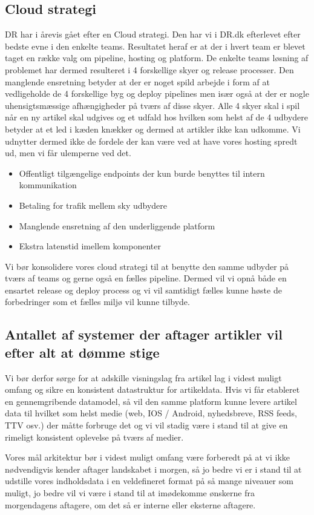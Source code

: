 \documentclass{article}
\begin{document}
\subsection{Cloud strategi}
DR har i årevis gået efter en Cloud strategi. Den har vi i DR.dk efterlevet efter bedste evne i den enkelte teams. Resultatet heraf er at der i hvert team er blevet taget en række valg om pipeline, hosting og platform.
De enkelte teams løsning af problemet har dermed resulteret i 4 forskellige skyer og release processer. Den manglende ensretning betyder at der er noget spild arbejde i form af at vedligeholde de 4 forskellige byg og deploy pipelines men især også at der er nogle uhensigtsmæssige afhængigheder på tværs af disse skyer. 
Alle 4 skyer skal i spil når en ny artikel skal udgives og et udfald hos hvilken som helst af de 4 udbydere betyder at et led i kæden knækker og dermed at artikler ikke kan udkomme. Vi udnytter dermed ikke de fordele der kan være ved at have vores hosting spredt ud, men vi får ulemperne ved det.
\begin{itemize}
\item Offentligt tilgængelige endpoints der kun burde benyttes til intern kommunikation
\item Betaling for trafik mellem sky udbydere
\item Manglende ensretning af den underliggende platform
\item Ekstra latenstid imellem komponenter 
\end{itemize}
Vi bør konsolidere vores cloud strategi til at benytte den samme udbyder på tværs af teams og gerne også en fælles pipeline. Dermed vil vi opnå både en ensartet release og deploy process og vi vil samtidigt fælles kunne høste de forbedringer som et fælles miljø vil kunne tilbyde.


\subsection{Antallet af systemer der aftager artikler vil efter alt at dømme stige}
Vi bør derfor sørge for at adskille visningslag fra artikel lag i videst muligt omfang og sikre en konsistent datastruktur for artikeldata. Hvis vi får etableret en gennemgribende datamodel, så vil den samme platform kunne levere artikel data til hvilket som helst medie (web, IOS / Android, nyhedsbreve, RSS feeds, TTV osv.) der måtte forbruge det og vi vil stadig være i stand til at give en rimeligt konsistent oplevelse på tværs af medier.

Vores mål arkitektur bør i videst muligt omfang være forberedt på at vi ikke nødvendigvis kender aftager landskabet i morgen, så jo bedre vi er i stand til at udstille vores indholdsdata i en veldefineret format på så mange niveauer som muligt, jo bedre vil vi være i stand til at imødekomme ønskerne fra morgendagens aftagere, om det så er interne eller eksterne aftagere.
\end{document}
